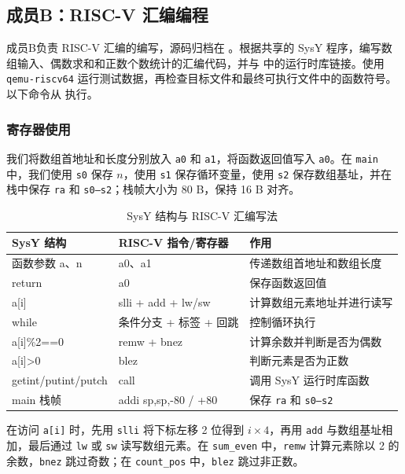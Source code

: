 \subsection{成员B：RISC-V 汇编编程}

成员B负责 RISC-V 汇编的编写，源码归档在 。根据共享的 SysY 程序，编写数组输入、偶数求和和正数个数统计的汇编代码，并与  中的运行时库链接。使用 \texttt{qemu-riscv64} 运行测试数据，再检查目标文件和最终可执行文件中的函数符号。以下命令从  执行。

\subsubsection{寄存器使用}

我们将数组首地址和长度分别放入 \texttt{a0} 和 \texttt{a1}，将函数返回值写入 \texttt{a0}。在 \texttt{main} 中，我们使用 \texttt{s0} 保存 $n$，使用 \texttt{s1} 保存循环变量，使用 \texttt{s2} 保存数组基址，并在栈中保存 \texttt{ra} 和 \texttt{s0--s2}；栈帧大小为 80 B，保持 16 B 对齐。

\begin{table}[H]
\centering

\begin{tabularx}{0.96\linewidth}{>{\ttfamily}p{3.1cm} >{\ttfamily}p{4.2cm} X}
\toprule
\normalfont SysY 结构 & \normalfont RISC-V 指令/寄存器 & \normalfont 作用 \\
\midrule
函数参数 a、n & a0、a1 & 传递数组首地址和数组长度 \\
return & a0 & 保存函数返回值 \\
a[i] & slli + add + lw/sw & 计算数组元素地址并进行读写 \\
while & 条件分支 + 标签 + 回跳 & 控制循环执行 \\
a[i]\%2==0 & remw + bnez & 计算余数并判断是否为偶数 \\
a[i]>0 & blez & 判断元素是否为正数 \\
getint/putint/\newline putch & call & 调用 SysY 运行时库函数 \\
main 栈帧 & addi sp,sp,-80 / +80 & 保存 \texttt{ra} 和 \texttt{s0--s2} \\
\bottomrule
\end{tabularx}
\caption{SysY 结构与 RISC-V 汇编写法}
\label{tab:q2-riscv-structure}
\end{table}

在访问 \texttt{a[i]} 时，先用 \texttt{slli} 将下标左移 2 位得到 $i\times4$，再用 \texttt{add} 与数组基址相加，最后通过 \texttt{lw} 或 \texttt{sw} 读写数组元素。在 \texttt{sum\_even} 中，\texttt{remw} 计算元素除以 2 的余数，\texttt{bnez} 跳过奇数；在 \texttt{count\_pos} 中，\texttt{blez} 跳过非正数。

